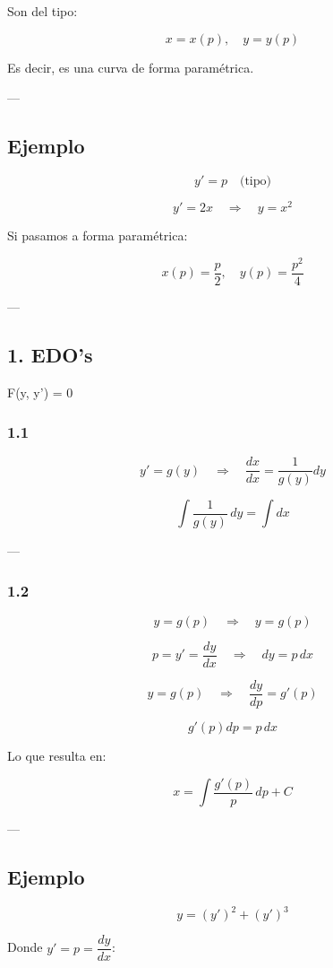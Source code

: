 \documentclass[a4paper,12pt]{article}
\begin{document}
Son del tipo:

\[
x = x(p), \quad y = y(p)
\]

Es decir, es una curva de forma paramétrica.

---

\subsection*{Ejemplo}

\[
y' = p \quad \text{(tipo)}
\]

\[
y' = 2x \quad \Rightarrow \quad y = x^2
\]

Si pasamos a forma paramétrica:

\[
x(p) = \frac{p}{2}, \quad y(p) = \frac{p^2}{4}
\]

---

\subsection*{1. EDO's } F(y, y') = 0

\subsubsection*{1.1}
\[
y' = g(y) \quad \Rightarrow \quad \frac{dx}{dx} = \frac{1}{g(y)} dy
\]

\[
\int \frac{1}{g(y)}\, dy = \int dx
\]

---

\subsubsection*{1.2}
\[
y = g(p) \quad \Rightarrow \quad y = g(p)
\]

\[
p = y' = \frac{dy}{dx} \quad \Rightarrow \quad dy = p\, dx
\]

\[
y = g(p) \quad \Rightarrow \quad \frac{dy}{dp} = g'(p)
\]

\[
g'(p) dp = p\, dx
\]

Lo que resulta en:

\[
x = \int \frac{g'(p)}{p}\, dp + C
\]

---

\subsection*{Ejemplo}

\[
y = (y')^2 + (y')^3
\]

Donde \( y' = p = \dfrac{dy}{dx} \):
\end{document}
